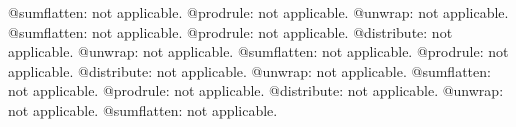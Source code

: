 \documentclass[11pt]{article}
\begin{document}
@sumflatten: not applicable.
@prodrule: not applicable.
@unwrap: not applicable.
@sumflatten: not applicable.
@prodrule: not applicable.
@distribute: not applicable.
@unwrap: not applicable.
@sumflatten: not applicable.
@prodrule: not applicable.
@distribute: not applicable.
@unwrap: not applicable.
@sumflatten: not applicable.
@prodrule: not applicable.
@distribute: not applicable.
@unwrap: not applicable.
@sumflatten: not applicable.
\end{document}
